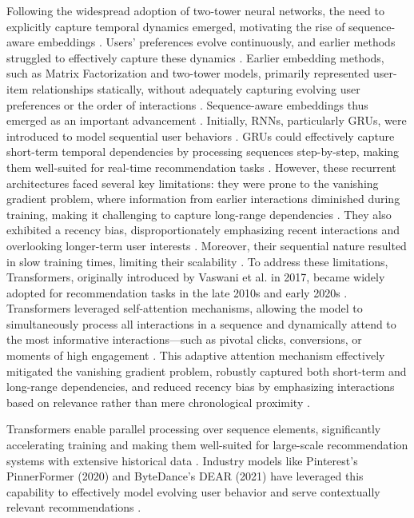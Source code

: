 \documentclass[final]{anthology-ch}         %
\begin{document}
Following the widespread adoption of two-tower neural networks, the need to explicitly capture temporal dynamics emerged, motivating the rise of sequence-aware embeddings \cite{quadrana2018sequence}. Users’ preferences evolve continuously, and earlier methods struggled to effectively capture these dynamics \cite{gama2014survey}. Earlier embedding methods, such as Matrix Factorization and two-tower models, primarily represented user-item relationships statically, without adequately capturing evolving user preferences or the order of interactions \cite{koren2009matrix, covington2016deep}. Sequence-aware embeddings thus emerged as an important advancement \cite{quadrana2018sequence}. Initially, RNNs, particularly GRUs, were introduced to model sequential user behaviors \cite{kang2018sasrec}. GRUs could effectively capture short-term temporal dependencies by processing sequences step-by-step, making them well-suited for real-time recommendation tasks \cite{kang2018sasrec, zhao2021dear}. However, these recurrent architectures faced several key limitations: they were prone to the vanishing gradient problem, where information from earlier interactions diminished during training, making it challenging to capture long-range dependencies \cite{Bengio1994}. They also exhibited a recency bias, disproportionately emphasizing recent interactions and overlooking longer-term user interests \cite{Pascanu2013}. Moreover, their sequential nature resulted in slow training times, limiting their scalability \cite{shim2022comparison}. To address these limitations, Transformers, originally introduced by Vaswani et al. in 2017, became widely adopted for recommendation tasks in the late 2010s and early 2020s \cite{vaswani2017attention}. Transformers leveraged self-attention mechanisms, allowing the model to simultaneously process all interactions in a sequence and dynamically attend to the most informative interactions—such as pivotal clicks, conversions, or moments of high engagement \cite{vaswani2017attention}. This adaptive attention mechanism effectively mitigated the vanishing gradient problem, robustly captured both short-term and long-range dependencies, and reduced recency bias by emphasizing interactions based on relevance rather than mere chronological proximity \cite{kang2018sasrec, vaswani2017attention}. 

Transformers enable parallel processing over sequence elements, significantly accelerating training and making them well-suited for large-scale recommendation systems with extensive historical data \cite{vaswani2017attention, kang2018sasrec}. Industry models like Pinterest’s PinnerFormer (2020) and ByteDance’s DEAR (2021) have leveraged this capability to effectively model evolving user behavior and serve contextually relevant recommendations \cite{pancha2022pinnerformer, zhao2021dear}.
\end{document}
